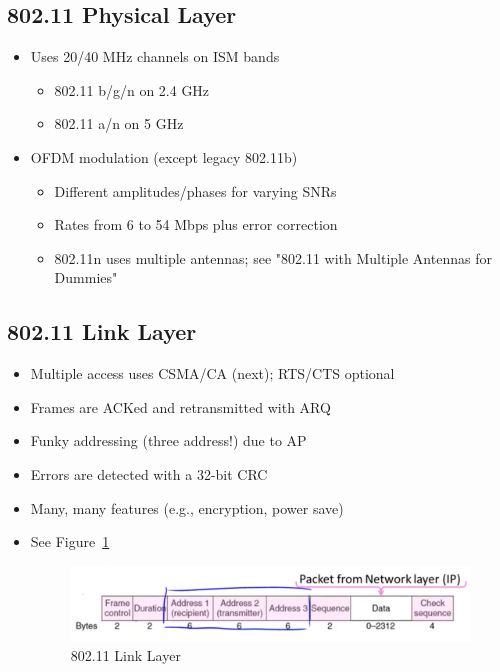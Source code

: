 \documentclass[12pt]{ctexart}   %
\begin{document}
	\subsection{ 802.11 Physical Layer}
	\begin{itemize}
		\item Uses 20/40 MHz channels on ISM bands
		\begin{itemize}
			\item 802.11 b/g/n on 2.4 GHz
			\item 802.11 a/n on 5 GHz
		\end{itemize}
		
		\item OFDM modulation (except legacy 802.11b)
		\begin{itemize}
			\item Different amplitudes/phases for varying SNRs
			\item Rates from 6 to 54 Mbps plus error correction
			\item 802.11n uses multiple antennas; see "802.11 with Multiple Antennas for Dummies"
		\end{itemize}
	\end{itemize}
	
	\subsection{ 802.11 Link Layer}
	\begin{itemize}
		\item Multiple access uses CSMA/CA (next); RTS/CTS optional
		\item Frames are ACKed and retransmitted with ARQ
		\item Funky addressing (three address!) due to AP
		\item Errors are detected with a 32-bit CRC
		\item Many, many features (e.g., encryption, power save)
		\item See Figure~\ref{fig:3-6-10}
		
		\begin{figure}[h!] %
		\centering
		 \includegraphics[scale=0.7]{images/3-6-10}
		\caption{ 802.11 Link Layer }
		 \label{fig:3-6-10}
		 \end{figure}
	\end{itemize}
	
\end{document}

